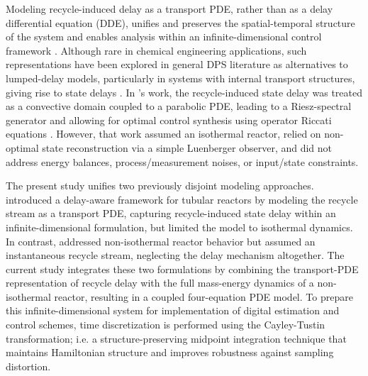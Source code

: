 Modeling recycle-induced delay as a transport PDE, rather than as a delay differential equation (DDE), unifies and preserves the spatial-temporal structure of the system and enables analysis within an infinite-dimensional control framework \autocite{Krstic2009Delay}. Although rare in chemical engineering applications, such representations have been explored in general DPS literature as alternatives to lumped-delay models, particularly in systems with internal transport structures, giving rise to state delays \autocite{Qi2021Output,Cassol2019Heat}. In 's work, the recycle-induced state delay was treated as a convective domain coupled to a parabolic PDE, leading to a Riesz-spectral generator and allowing for optimal control synthesis using operator Riccati equations \autocite{Moadeli2025Optimal}. However, that work assumed an isothermal reactor, relied on non-optimal state reconstruction via a simple Luenberger observer, and did not address energy balances, process/measurement noises, or input/state constraints.

The present study unifies two previously disjoint modeling approaches.  \autocite{Moadeli2025Optimal} introduced a delay-aware framework for tubular reactors by modeling the recycle stream as a transport PDE, capturing recycle-induced state delay within an infinite-dimensional formulation, but limited the model to isothermal dynamics. In contrast,  \autocite{Khatibi2021Model} addressed non-isothermal reactor behavior but assumed an instantaneous recycle stream, neglecting the delay mechanism altogether. The current study integrates these two formulations by combining the transport-PDE representation of recycle delay with the full mass-energy dynamics of a non-isothermal reactor, resulting in a coupled four-equation PDE model. To prepare this infinite-dimensional system for implementation of digital estimation and control schemes, time discretization is performed using the Cayley-Tustin transformation; i.e. a structure-preserving midpoint integration technique that maintains Hamiltonian structure and improves robustness against sampling distortion\autocite{havu2007cayley, xu2017linear}.

